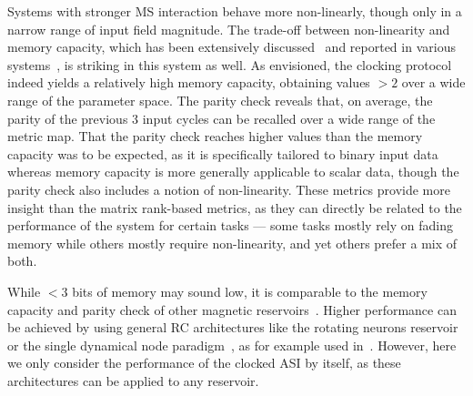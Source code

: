 Systems with stronger MS interaction behave more non-linearly, though only in a narrow range of input field magnitude.
The trade-off between non-linearity and memory capacity, which has been extensively discussed~\cite{dambre2012information,MemoryNonlinearityReservoirs,RC_BeyondMemoryNonlinearity,RC_unification} and reported in various systems~\cite{DynamicEmergence_NanomagneticSystem,RC_TaskAgnosticMetrics_v2,TaskAdaptivePRC}, is striking in this system as well.
As envisioned, the clocking protocol indeed yields a relatively high memory capacity, obtaining values $>2$ over a wide range of the parameter space.
The parity check reveals that, on average, the parity of the previous 3 input cycles can be recalled over a wide range of the metric map.
That the parity check reaches higher values than the memory capacity was to be expected, as it is specifically tailored to binary input data whereas memory capacity is more generally applicable to scalar data, though the parity check also includes a notion of non-linearity.
These metrics provide more insight than the matrix rank-based metrics, as they can directly be related to the performance of the system for certain tasks --- some tasks mostly rely on fading memory while others mostly require non-linearity, and yet others prefer a mix of both. \par
While $<3$ bits of memory may sound low, it is comparable to the memory capacity and parity check of other magnetic reservoirs~\cite{AdaptiveProgrammableRC,hon2021numerical,tsunegi2019STOforcedsyncRC,Venkat_2024}. %
Higher performance can be achieved by using general RC architectures like the rotating neurons reservoir~\cite{RotatingNeuronsRC} or the single dynamical node paradigm~\cite{appeltant2011information}, as for example used in~.
However, here we only consider the performance of the clocked ASI by itself, as these architectures can be applied to any reservoir.

